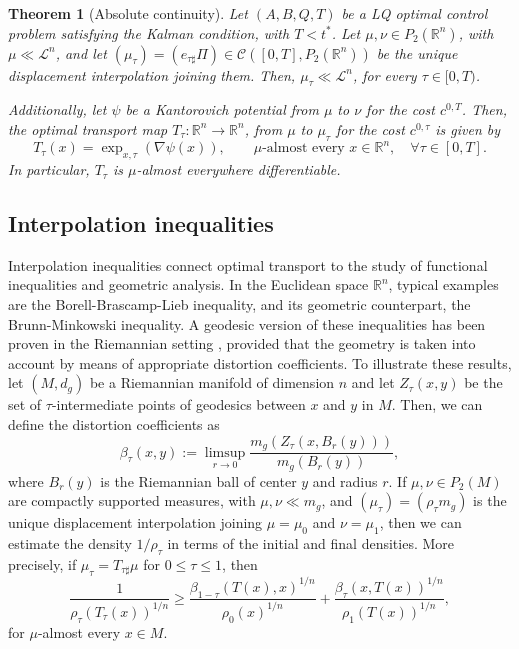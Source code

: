 \documentclass[reqno]{amsart}
\theoremstyle{plain}
\newtheorem{thm}{Theorem}[section]
\theoremstyle{definition}
\theoremstyle{remark}
\begin{document}
	\begin{thm}[Absolute continuity]
  Let $(A,B,Q,T)$ be a LQ optimal control problem satisfying the Kalman condition, with $T<t^*$. Let $\mu, \nu\in P_2(\mathbb{R}^n)$, with $\mu\ll\mathscr{L}^n$, and let $(\mu_\tau)=(e_{\tau\sharp}\Pi)\in\mathcal{C}([0,T],P_2(\mathbb{R}^n))$ be the unique displacement interpolation joining them. Then, $\mu_\tau\ll\mathscr{L}^n$, for every $\tau\in[0,T)$. 

        Additionally, let $\psi$ be a Kantorovich potential from $\mu$ to $\nu$ for the cost $c^{0,T}$. Then, the optimal transport map $T_\tau:\mathbb{R}^n\to\mathbb{R}^n$, from $\mu$ to $\mu_\tau$ for the cost $c^{0,\tau}$ is given by
        \begin{equation}
			T_\tau(x)=\exp_{x,\tau}(\nabla\psi(x)),\qquad\mu\text{-almost every }x\in\mathbb{R}^n, \quad\forall \tau\in[0,T].
		\end{equation}
        In particular, $T_\tau$ is $\mu$-almost everywhere differentiable.
	\end{thm}
    
    \subsection{Interpolation inequalities}
    
	Interpolation inequalities connect optimal transport to the study of functional inequalities and geometric analysis. In the Euclidean space $\mathbb{R}^n$, typical examples are the Borell-Brascamp-Lieb inequality, and its geometric counterpart, the Brunn-Minkowski inequality. A geodesic version of these inequalities has been proven in the Riemannian setting \cite{ARiemintineq,McCann1997ACP}, provided that the geometry is taken into account by means of appropriate distortion coefficients. To illustrate these results, let $(M,d_g)$ be a Riemannian manifold of dimension $n$ and let $Z_\tau(x,y)$ be the set of $\tau$-intermediate points of geodesics between $x$ and $y$ in $M$. Then, we can define the distortion coefficients as
	\begin{equation}
		\beta_\tau(x,y):=\limsup\limits_{r\to 0}\frac{m_g(Z_\tau(x,B_r(y)))}{m_g(B_r(y))},
	\end{equation}
	where $B_r(y)$ is the Riemannian ball of center $y$ and radius $r$. If $\mu,\nu\in P_2(M)$ are compactly supported measures, with $\mu,\nu\ll m_g$, and $(\mu_\tau)=(\rho_\tau m_g)$ is the unique displacement interpolation joining $\mu=\mu_0$ and $\nu=\mu_1$, then we can estimate the density $1/\rho_\tau$ in terms of the initial and final densities. More precisely, if $\mu_\tau=T_{\tau\sharp}\mu$ for $0\leq \tau \leq 1$, then 
	\begin{equation}\label{interpolation_intro}
		\frac{1}{\rho_\tau(T_\tau(x))^{1/n}}\geq\frac{\beta_{1-\tau}(T(x),x)^{1/n}}{\rho_0(x)^{1/n}}+\frac{\beta_{\tau}(x,T(x))^{1/n}}{\rho_1(T(x))^{1/n}},
	\end{equation}
	for $\mu$-almost every $x\in M$.
	
\end{document}
